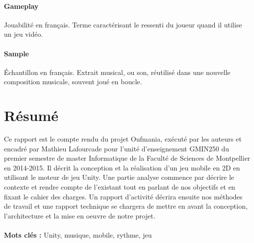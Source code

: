 \documentclass [a4 paper,11pt]{report}
\begin{document}
\paragraph{Gameplay} Jouabilité en français. Terme caractérisant le ressenti du joueur quand il utilise un jeu vidéo.

\paragraph{Sample} Échantillon en français. Extrait musical, ou son, réutilisé dans une nouvelle composition musicale, souvent joué en boucle.

\paragraph{}



\newpage




\newpage



\newpage



\newpage



\newpage



\newpage



\newpage
\pagestyle{empty}
\section*{Résumé}
Ce rapport est le compte rendu du projet Oufmania, exécuté par les auteurs et encadré par Mathieu Lafourcade pour l'unité d'enseignement GMIN250 du premier semestre de master Informatique de la Faculté de Sciences de Montpellier en 2014-2015. Il décrit la conception et la réalisation d'un jeu mobile en 2D en utilisant le moteur de jeu Unity. Une partie analyse commence par décrire le contexte et rendre compte de l'existant tout en parlant de nos objectifs et en fixant le cahier des charges. Un rapport d'activité décrira ensuite nos méthodes de travail et une rapport technique se chargera de mettre en avant la conception, l'architecture et la mise en oeuvre de notre projet.
\\\\
\textbf{Mots clés : } Unity, musique, mobile, rythme, jeu
\end{document}
